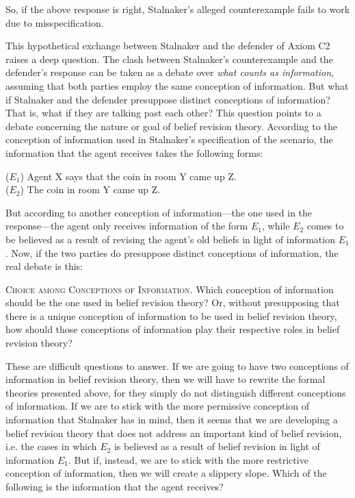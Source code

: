 So, if the above response is right, Stalnaker's alleged counterexample fails to work due to misspecification. 

This hypothetical exchange between Stalnaker and the defender of Axiom C2 raises a deep question. The clash between Stalnaker's counterexample and the defender's response can be taken as a debate over {\em what counts as information}, assuming that both parties employ the same conception of information. But what if Stalnaker and the defender presuppose distinct conceptions of information? That is, what if they are talking past each other? This question points to a debate concerning the nature or goal of belief revision theory. According to the conception of information used in Stalnaker's specification of the scenario, the information that the agent receives takes the following forms: \op

	\xm ($E_1$) Agent X says that the coin in room Y came up Z.
	\\ ($E_2$) The coin in room Y came up Z.

\ed 
But according to another conception of information---the one used in the response---the agent only receives information of the form $E_1$, while $E_2$ comes to be believed as a result of revising the agent's old beliefs in light of information $E_1$. Now, if the two parties do presuppose distinct conceptions of information, the real debate is this:\op

	\xm \textsc{Choice among Conceptions of Information.} Which conception of information should be the one used in belief revision theory? Or, without presupposing that there is a unique conception of information to be used in belief revision theory, how should those conceptions of information play their respective roles in belief revision theory? 

\ed These are difficult questions to answer. If we are going to have two conceptions of information in belief revision theory, then we will have to rewrite the formal theories presented above, for they simply do not distinguish different conceptions of information. If we are to stick with the more permissive conception of information that Stalnaker has in mind, then it seems that we are developing a belief revision theory that does not address an important kind of belief revision, i.e. the cases in which $E_2$ is believed as a result of belief revision in light of information $E_1$. But if, instead, we are to stick with the more restrictive conception of information, then we will create a slippery slope. Which of the following is the information that the agent receives?\op


